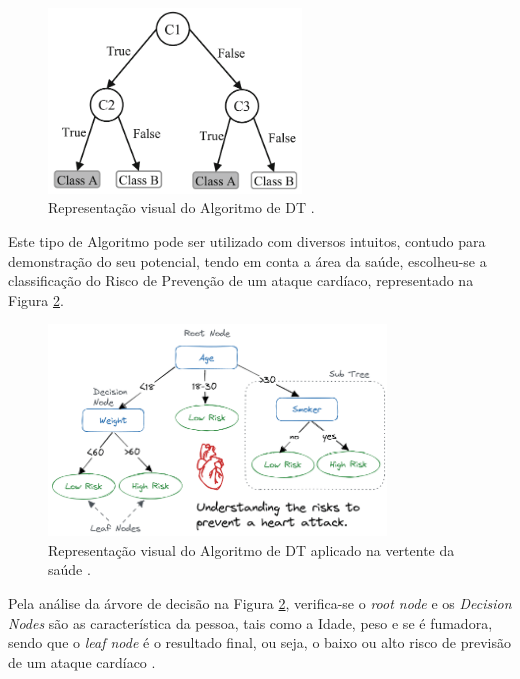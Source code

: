 \documentclass[12pt,a4paper,twoside]{report}
\begin{document}
{\begin{figure}[H]
    \centering
    \includegraphics[width=0.6\textwidth]{imagens/decisiontree.png}
    \caption{Representação visual do Algoritmo de \gls{DT} \cite{Uddin2019ComparingDS}.}
    \label{fig:decisiontree}
\end{figure}

Este tipo de Algoritmo pode ser utilizado com diversos intuitos, contudo para demonstração do seu potencial, tendo em conta a área da saúde, escolheu-se a classificação do Risco de Prevenção de um ataque cardíaco, representado na Figura \ref{fig:heart}.

\begin{figure}[H]
    \centering
    \includegraphics[width=0.8\textwidth]{imagens/decisionTreeRealExample.png}
    \caption{Representação visual do Algoritmo de \gls{DT} aplicado na vertente da saúde \cite{datacamp_decision_tree_tutorial}.}
    \label{fig:heart}
\end{figure}

Pela análise da árvore de decisão na Figura \ref{fig:heart}, verifica-se o \textit{root node} e os \textit{Decision Nodes} são as característica da pessoa, tais como a Idade, peso e se é fumadora, sendo que o \textit{leaf node} é o resultado final, ou seja, o baixo ou alto risco de previsão de um ataque cardíaco  \cite{datacamp_decision_tree_tutorial}. 


}
\end{document}
